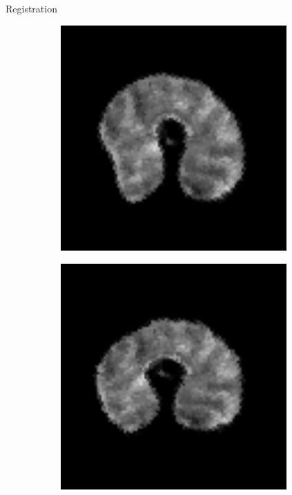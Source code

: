\documentclass[10pt]{beamer}
\begin{document}
\begin{frame}{Registration}
\begin{figure}[ht]
\begin{subfigure}[t]{0.25\textwidth}
    \includegraphics[width=0.95\textwidth]{fig/registration_wheat_affine}
    \caption{}
    \label{subfig:registration_wheat_affine}
  \end{subfigure}%
  \begin{subfigure}[t]{0.25\textwidth}
    \centering
    \includegraphics[width=0.95\textwidth]{fig/registration_wheat_dtssd}
    \caption{}
    \label{subfig:registration_wheat_dtssd}
  \end{subfigure}%
\end{figure}
\end{frame}
\end{document}
